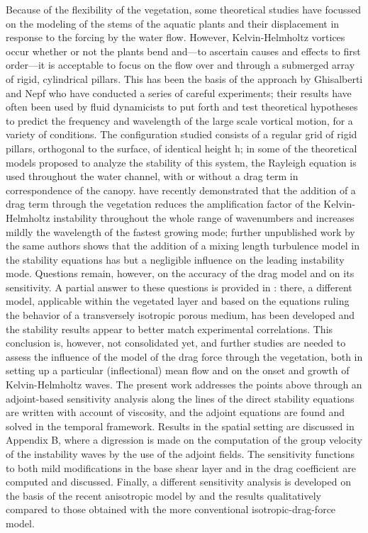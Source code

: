 Because of the flexibility of the vegetation, some theoretical studies have focussed on the
modeling of the stems of the aquatic plants and their displacement in response to the forcing by the
water flow. \cite{py2004mixing} \cite{patil2010characteristics} However, Kelvin-Helmholtz vortices occur whether or not the plants bend and—to
ascertain causes and effects to first order—it is acceptable to focus on the flow over and through a
submerged array of rigid, cylindrical pillars. This has been the basis of the approach by Ghisalberti
and Nepf \cite{ghisalberti2002mixing} \cite{ghisalberti2004limited} \cite{ghisalberti2005mass} who have conducted a series of careful experiments; their results have often been
used by fluid dynamicists to put forth and test theoretical hypotheses to predict the frequency and
wavelength of the large scale vortical motion, for a variety of conditions. The configuration studied
consists of a regular grid of rigid pillars, orthogonal to the surface, of identical height h; in some
of the theoretical models proposed to analyze the stability of this system, the Rayleigh equation is
used throughout the water channel, with or without a drag term in correspondence of the canopy. \cite{raupach1996coherent} \cite{py2004mixing} \cite{singh2016linear}
\cite{zampogna2016instability} have recently demonstrated that the addition of a drag term through the vegetation reduces the amplification factor of the Kelvin-Helmholtz instability throughout the whole
range of wavenumbers and increases mildly the wavelength of the fastest growing mode; further
unpublished work by the same authors shows that the addition of a mixing length turbulence model
in the stability equations has but a negligible influence on the leading instability mode. Questions
remain, however, on the accuracy of the drag model and on its sensitivity. A partial answer to these
questions is provided in \cite{zampogna2016instability}: there, a different model, applicable within the vegetated layer and
based on the equations ruling the behavior of a transversely isotropic porous medium, has been
developed and the stability results appear to better match experimental correlations. This conclusion
is, however, not consolidated yet, and further studies are needed to assess the influence of the model
of the drag force through the vegetation, both in setting up a particular (inflectional) mean flow and
on the onset and growth of Kelvin-Helmholtz waves.
The present work addresses the points above through an adjoint-based sensitivity analysis along
the lines of \cite{bottaro2003effect} the direct stability equations are written with account of viscosity, and
the adjoint equations are found and solved in the temporal framework. Results in the spatial setting
are discussed in Appendix B, where a digression is made on the computation of the group velocity
of the instability waves by the use of the adjoint fields. The sensitivity functions to both mild
modifications in the base shear layer and in the drag coefficient are computed and discussed. Finally,
a different sensitivity analysis is developed on the basis of the recent anisotropic model by \cite{zampogna2016instability} and the results qualitatively compared to those obtained with the more conventional
isotropic-drag-force model.



